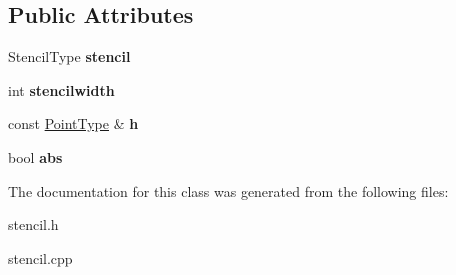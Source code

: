 \subsection*{Public Attributes}
\begin{DoxyCompactItemize}
\item 
\hypertarget{classStencil_a73fd87ad5880d4a3a4cecc63712a0642}{Stencil\-Type {\bfseries stencil}}\label{classStencil_a73fd87ad5880d4a3a4cecc63712a0642}

\item 
\hypertarget{classStencil_a8543574d7ac8d3571ba703aad105c1b8}{int {\bfseries stencilwidth}}\label{classStencil_a8543574d7ac8d3571ba703aad105c1b8}

\item 
\hypertarget{classStencil_a21b81119e8854c9122e0c44fb74ef296}{const \hyperlink{classArray}{Point\-Type} \& {\bfseries h}}\label{classStencil_a21b81119e8854c9122e0c44fb74ef296}

\item 
\hypertarget{classStencil_a155abc662ac1cfe4b7b8bdd919297dbc}{bool {\bfseries abs}}\label{classStencil_a155abc662ac1cfe4b7b8bdd919297dbc}

\end{DoxyCompactItemize}


The documentation for this class was generated from the following files\-:\begin{DoxyCompactItemize}
\item 
stencil.\-h\item 
stencil.\-cpp\end{DoxyCompactItemize}
